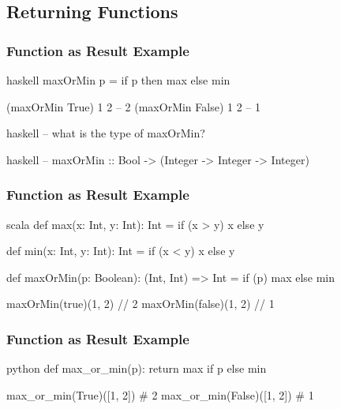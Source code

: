 \documentclass[dvipsnames]{beamer}
\theoremstyle{plain}
\begin{document}
\subsection{Returning Functions}

\begin{frame}[fragile]
  \frametitle{Function as Result Example}

  \begin{example}[Haskell]
    \begin{pygments}{haskell}
maxOrMin p = if p then max else min

(maxOrMin True) 1 2   -- 2
(maxOrMin False) 1 2  -- 1
    \end{pygments}

    \pause
    \begin{pygments}{haskell}
-- what is the type of maxOrMin?
    \end{pygments}

    \pause
    \begin{pygments}{haskell}
-- maxOrMin :: Bool -> (Integer -> Integer -> Integer)
    \end{pygments}
  \end{example}
\end{frame}

\begin{frame}[fragile]
  \frametitle{Function as Result Example}

  \begin{example}[Scala]
    \begin{pygments}{scala}
def max(x: Int, y: Int): Int = if (x > y) x else y

def min(x: Int, y: Int): Int = if (x < y) x else y

def maxOrMin(p: Boolean): (Int, Int) => Int =
    if (p) max else min

maxOrMin(true)(1, 2)          // 2
maxOrMin(false)(1, 2)         // 1
    \end{pygments}
  \end{example}
\end{frame}

\begin{frame}[fragile]
  \frametitle{Function as Result Example}

  \begin{example}[Python]
    \begin{pygments}{python}
def max_or_min(p):
    return max if p else min

max_or_min(True)([1, 2])        # 2
max_or_min(False)([1, 2])       # 1
    \end{pygments}
  \end{example}
\end{frame}
\end{document}
